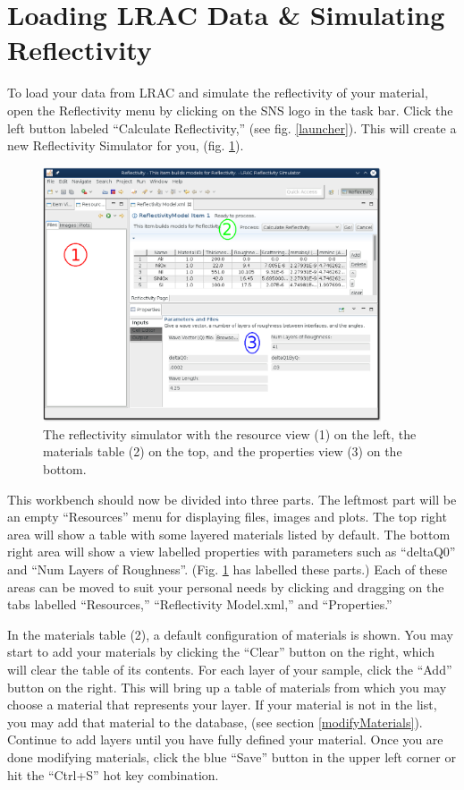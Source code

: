 \section{Loading LRAC Data \& Simulating Reflectivity}
\label{simulate}

To load your data from LRAC and simulate the reflectivity of your material, open
the Reflectivity menu by clicking on the SNS logo in the task bar. Click the
left button labeled ``Calculate Reflectivity,'' (see fig. \ref{launcher}).
This will create a new Reflectivity Simulator for you, (fig. \ref{simulator}).

\begin{figure}[!h]
\centering
\includegraphics[width=10cm]{images/simulator_sections.png}
\caption{The reflectivity simulator with the resource view (1) on the left, the
materials table (2) on the top, and the properties view (3) on the bottom.}
\label{simulator}
\end{figure}

This workbench should now be divided into three parts. The leftmost part will be
an empty ``Resources'' menu for displaying files, images and plots. The top
right area will show a table with some layered materials listed by default. The
bottom right area will show a view labelled properties with parameters such as
``deltaQ0'' and ``Num Layers of Roughness''. (Fig. \ref{simulator} has labelled
these parts.) Each of these areas can be moved to suit your personal needs by
clicking and dragging on the tabs labelled ``Resources,'' ``Reflectivity
Model.xml,'' and ``Properties.''

In the materials table (2), a default configuration of materials is shown. You
may start to add your materials by clicking the ``Clear'' button on the right,
which will clear the table of its contents. For each layer of your sample, click
the ``Add'' button on the right. This will bring up a table of materials from
which you may choose a material that represents your layer. If your material is
not in the list, you may add that material to the database, (see section
\ref{modifyMaterials}). Continue to add layers until you have fully defined your
material. Once you are done modifying materials, click the blue ``Save'' button
in the upper left corner or hit the ``Ctrl+S'' hot key combination.

